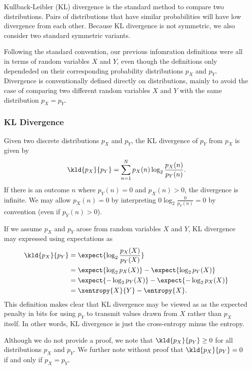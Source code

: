 Kullback-Leibler (KL) divergence is the standard method to compare two
distributions.  Pairs of distributions that have similar probabilities
will have low divergence from each other.  Because KL divergence is
not symmetric, we also consider two standard symmetric variants.

Following the standard convention, our previous infomration
definitions were all in terms of random variables $X$ and $Y$, even
though the definitions only dependeded on their corresponding
probability distributions $p_X$ and $p_Y$.  Divergence is
conventionally defined directly on distributions, mainly to avoid the
case of comparing two different random variables $X$ and $Y$ with the
same distribution $p_X = p_Y$.

\subsubsection{KL Divergence}

Given two discrete distributions $p_X$ and $p_Y$, the KL divergence of
$p_Y$ from $p_X$ is given by
%
\begin{equation}
\kld{p_X}{p_Y}
= \sum_{n=1}^N p_X(n) \log_2 \frac{p_X(n)}{p_Y(n)}.
\end{equation}
%
If there is an outcome $n$ where $p_Y(n) = 0$ and $p_X(n) > 0$, the
divergence is infinite.  We may allow $p_X(n) = 0$ by interpreting $0
\log_2 \frac{0}{p_Y(n)} = 0$ by convention (even if $p_Y(n) > 0$).

If we assume $p_X$ and $p_Y$ arose from random variables $X$ and $Y$,
KL divergence may expressed using expectations as
%
\begin{align}
\kld{p_X}{p_Y} 
&= \expect{\log_2 \frac{p_X(X)}{p_Y(X)}}
\\
&= \expect{\log_2 p_X(X)} - \expect{\log_2 p_Y(X)}
\\
&= \expect{-\log_2 p_Y(X)} - \expect{-\log_2 p_X(X)}
\\
&= \xentropy{X}{Y} - \entropy{X}.
\end{align}
%
This definition makes clear that KL divergence may be viewed as as the
expected penalty in bits for using $p_Y$ to transmit values drawn from
$X$ rather than $p_X$ itself.  In other words, KL divergence is just
the cross-entropy minus the entropy.

Although we do not provide a proof, we note that $\kld{p_X}{p_Y} \geq 0$
for all distributions $p_X$ and $p_Y$.  We further note without proof
that $\kld{p_X}{p_Y} = 0$ if and only if $p_X = p_Y$.


